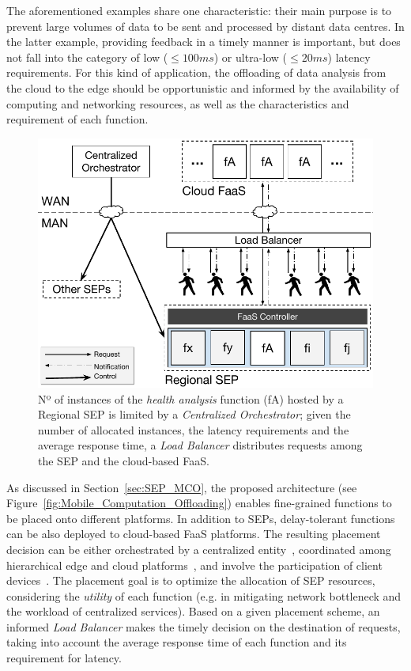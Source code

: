 The aforementioned examples share one characteristic: their main purpose is to prevent large volumes of data to be sent and processed by distant data centres. In the latter example, providing feedback in a timely manner is important, but does not fall into the category of low ($\leq 100ms$) or ultra-low ($\leq 20ms$) latency requirements. For this kind of application, the offloading of data analysis from the cloud to the edge should be opportunistic and informed by the availability of computing and networking resources, as well as the characteristics and requirement of each function.

\begin{figure}[tbp]
	\centering
	\includegraphics[width=\linewidth]{Figs/Edge_Data_Analytics_Personal_Assistant.pdf}
	\caption{Nº of instances of the \textit{health analysis} function (fA) hosted by a Regional SEP is limited by a \textit{Centralized Orchestrator}; given the number of allocated instances, the latency requirements and the average response time, a \textit{Load Balancer} distributes requests among the SEP and the cloud-based FaaS.}
	\label{fig:Edge_Data_Analytics_Personal_Assistant}
\end{figure}


As discussed in Section~\ref{sec:SEP_MCO}, the proposed architecture (see Figure~\ref{fig:Mobile_Computation_Offloading}) enables fine-grained functions to be placed onto different platforms. In addition to SEPs, delay-tolerant functions can be also deployed to cloud-based FaaS platforms. The resulting placement decision can be either orchestrated by a centralized entity~\cite{Taleb:2013}, coordinated among hierarchical edge and cloud platforms~\cite{Mach:2017}, and involve the participation of client devices~\cite{Baresi:2018}. The placement goal is to optimize the allocation of SEP resources, considering the \textit{utility} of each function (e.g. in mitigating network bottleneck and the workload of centralized services). Based on a given placement scheme, an informed \textit{Load Balancer} makes the timely decision on the destination of requests, taking into account the average response time of each function and its requirement for latency.%

